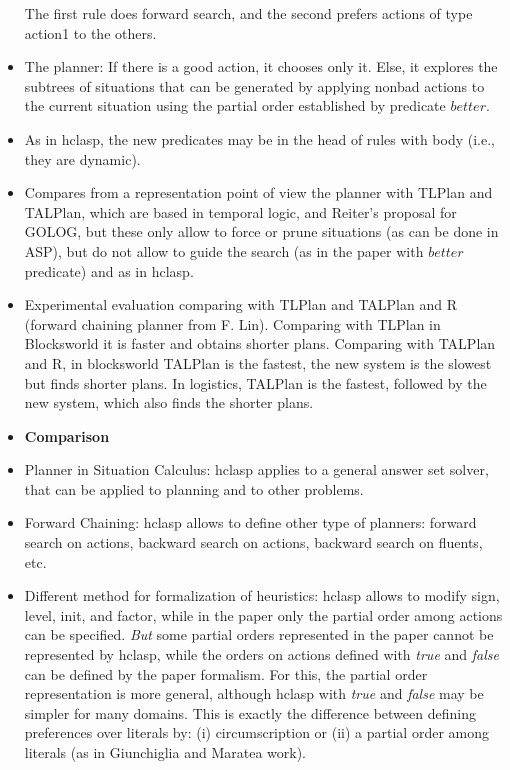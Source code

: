 \begin{itemize}
        The first rule does forward search, and the second prefers actions of type action1 to the others.         
  \item The planner: If there is a good action, it chooses only it. Else, it explores the subtrees of situations
        that can be generated by applying nonbad actions to the current situation using the partial order established
        by predicate $better$.
  \item As in hclasp, the new predicates may be in the head of rules with body (i.e., they are dynamic).
  \item Compares from a representation point of view the planner with TLPlan and TALPlan, 
        which are based in temporal logic, and 
        Reiter's proposal for GOLOG, but these only allow to force or prune situations (as can be done in ASP), 
        but do not allow to guide the search (as in the paper with $better$ predicate) and as in hclasp.  
  \item Experimental evaluation comparing with TLPlan and TALPlan and R (forward chaining planner from F. Lin).
        Comparing with TLPlan in Blocksworld it is faster and obtains shorter plans.
        Comparing with TALPlan and R, in blocksworld TALPlan is the fastest, the new system is the slowest but finds shorter plans.
        In logistics, TALPlan is the fastest, followed by the new system, which also finds the shorter plans.
  \item \textbf{Comparison}
  \item Planner in Situation Calculus: hclasp applies to a general answer set solver, that can be applied to 
        planning and to other problems.
  \item Forward Chaining: hclasp allows to define other type of planners: forward search on actions, backward search on actions, 
        backward search on fluents, etc.
  \item Different method for formalization of heuristics: hclasp allows to modify sign, level, init, and factor, 
        while in the paper only the partial order among actions can be specified. \textit{But} some partial orders 
        represented in the paper cannot be represented by hclasp, while the orders on actions defined with \textit{true} and 
        \textit{false} can be defined by the paper formalism. For this, the partial order representation is more general, 
        although hclasp with \textit{true} and \textit{false} may be simpler for many domains.
        This is exactly the difference between defining preferences over literals by: (i) circumscription or 
        (ii) a partial order among literals (as in Giunchiglia and Maratea work).        
\end{itemize}
        
